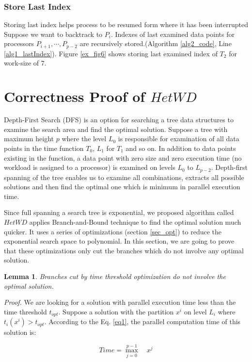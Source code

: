 \documentclass[12pt]{article}
\newtheorem{lemma}[theorem]{Lemma}
\begin{document}
\subsubsection{Store Last Index}
Storing last index helps process to be resumed form where it has been interrupted Suppose we want to backtrack to $P_i$. Indexes of last examined data points for processors $P_{i+1},\cdots,P_{p-2}$ are recursively stored.(Algorithm \ref{alg2_code}, Line \ref{alg1_lastIndex}). Figure \ref{ex_fig6} shows storing last examined index of $T_2$ for work-size of 7.

\section{Correctness Proof of $HetWD$}
Depth-First Search (DFS) is an option for searching a tree data structures to examine the search area and find the optimal solution. Suppose a tree with maximum height $p$ where the level $L_0$ is responsible for examination of all data points in the time function $T_0$, $L_1$ for $T_1$ and so on. In addition to data points existing in the function, a data point with zero size and zero execution time (no workload is assigned to a processor) is examined on levels $L_0$ to $L_{p-2}$. Depth-first spanning of the tree enables us to examine all combinations, extracts all possible solutions and then find the optimal one which is minimum in parallel execution time.

Since full spanning a search tree is exponential, we proposed algorithm called $HetWD$ applies Branch-and-Bound technique to find the optimal solution much quicker. It uses a series of optimizations (section \ref{sec_opt}) to reduce the exponential search space to polynomial. In this section, we are going to prove that these optimizations only cut the branches which do not involve any optimal solution.

\begin{lemma}	\label{lem_time_threshold}
	Branches cut by time threshold optimization do not involve the optimal solution.
\end{lemma}

\textit{Proof.} We are looking for a solution with parallel execution time less than the time threshold $t_{opt}$. Suppose a solution with the partition $x^i$ on level $L_i$ where $t_i(x^i) > t_{opt}$. According to the Eq. \ref{eq1}, the parallel computation time of this solution is:

$$Time = \max_{j=0}^{p-1} \quad x^j$$
\end{document}
